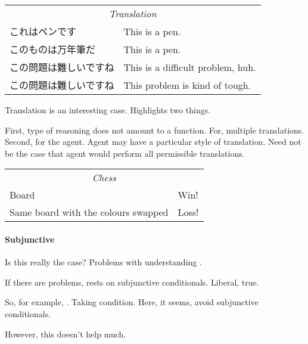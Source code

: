 \begin{note}
  \begin{center}
    \begin{tabular}[h]{p{.55\linewidth}|p{.4\linewidth}}
      \multicolumn{2}{c}{\emph{Translation}} \\
      これはペンです & This is a pen. \\
      このものは万年筆だ & This is a pen. \\
      この問題は難しいですね & This is a difficult problem, huh. \\
      この問題は難しいですね & This problem is kind of tough. \\
    \end{tabular}
  \end{center}

  Translation is an interesting case.
  Highlights two things.

  First, type of reasoning does not amount to a function.
  For, multiple translations.
  Second, for the agent.
  Agent may have a particular style of translation.
  Need not be the case that agent would perform all permissible translations.
\end{note}

\begin{note}
  \begin{center}
    \begin{tabular}[h]{p{.55\linewidth}|p{.4\linewidth}}
      \multicolumn{2}{c}{\emph{Chess}} \\
      Board & Win! \\
      Same board with the colours swapped & Loss! \\
    \end{tabular}
  \end{center}
\end{note}

\paragraph{Subjunctive}

\begin{note}
  Is this really the case?
  Problems with understanding \tR{}.

  If there are problems, rests on subjunctive conditionals.
  Liberal, true.

  So, for example, \citeauthor{Boghossian:2014aa}.
  Taking condition.
  Here, it seems, avoid subjunctive conditionals.

  However, this doesn't help much.
\end{note}

